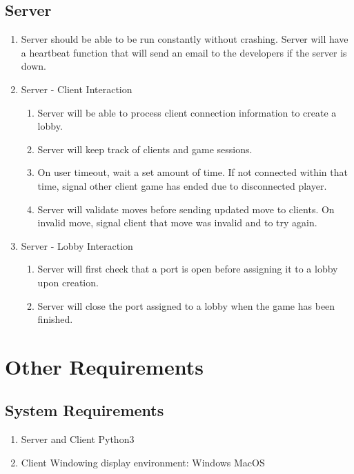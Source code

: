 \documentclass[10pt]{article}
\begin{document}
\subsection{Server}

\begin{enumerate}[resume*]
    \item Server should be able to be run constantly without crashing.
        \subitem Server will have a heartbeat function that will send an email to the developers if the server is down.
    \item Server - Client Interaction
    \begin{enumerate}[label*=\arabic*.]
        \item Server will be able to process client connection information to create a lobby.
        \item Server will keep track of clients and game sessions.
        \item On user timeout, wait a set amount of time.
            \subitem If not connected within that time, signal other client game has ended due to disconnected player.
        \item Server will validate moves before sending updated move to clients.
            \subitem On invalid move, signal client that move was invalid and to try again.
    \end{enumerate}
    \item Server - Lobby Interaction
    \begin{enumerate}[label*=\arabic*.]
        \item Server will first check that a port is open before assigning it to a lobby upon creation.
        \item Server will close the port assigned to a lobby when the game has been finished.
    \end{enumerate}
\end{enumerate}

\section{Other Requirements}

\subsection{System Requirements}

\begin{enumerate}[label*=S\arabic*.]
    \item Server and Client
        \subitem Python3
    \item Client
        \subitem Windowing display environment:
            \subsubitem Windows
            \subsubitem MacOS
\end{enumerate}
\end{document}
